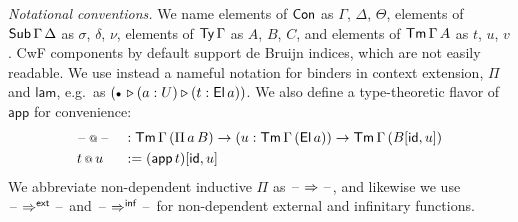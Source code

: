 \documentclass[sigplan,review,anonymous]{acmart}\settopmatter{printfolios=true,printccs=false,printacmref=false}
\makeatletter
\newcommand{\ext}{\triangleright}
\newcommand{\emptycon}{\scaleobj{.75}\bullet}
\newcommand{\Pii}{\Pi}
\newcommand{\appi}{\mathsf{app}}
\newcommand{\lami}{\mathsf{lam}}
\newcommand{\Pie}{\Pi^{\mathsf{ext}}}
\newcommand{\Piinf}{\Pi^{\mathsf{inf}}}
\newcommand{\appitt}{\mathop{{\scriptstyle @}}}
\newcommand{\p}{\mathsf{p}}
\newcommand{\arri}{\Rightarrow}
\newcommand{\arre}{\Rightarrow^{\mathsf{ext}}}
\newcommand{\arrinf}{\Rightarrow^{\mathsf{inf}}}
\makeatother
\begin{document}
\emph{Notational conventions.} We name elements of $\mathsf{Con}$ as $\Gamma$, $\Delta$,
$\Theta$, elements of $\mathsf{Sub}\,\Gamma\,\Delta$ as $\sigma$, $\delta$, $\nu$,
elements of $\mathsf{Ty}\,\Gamma$ as $A$, $B$, $C$, and elements of $\mathsf{Tm}\,\Gamma\,A$ as
$t$, $u$, $v$. CwF components by default support de Bruijn indices, which are
not easily readable. We use instead a nameful notation for binders in context
extension, $\Pii$ and $\lami$, e.g.\ as $(\emptycon\,\ext (a : U) \ext (t :
\El\,a))$. We also define a type-theoretic flavor of $\appi$ for convenience:
\begin{alignat*}{3}
  & \blank\appitt\blank && :
      \Tm\,\Gamma\,(\Pii\,a\,B)\ra
      (u : \Tm\,\Gamma\,(\El\,a)) \ra \Tm\,\Gamma\,(B[\id, u])\\
  & t\appitt u && := (\appi\,t)[\id, u]
\end{alignat*}
We abbreviate non-dependent inductive $\Pii$ as $\blank\arri\blank$, and
likewise we use $\blank\arre\blank$ and $\blank\arrinf\blank$ for non-dependent
external and infinitary functions.

\end{document}
